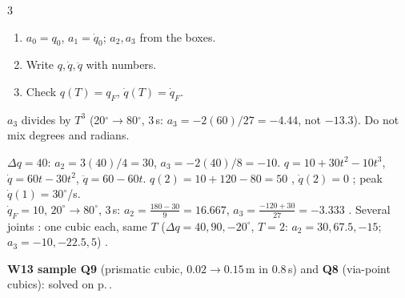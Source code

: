 \begin{multicols}{3}
\begin{recipe}
\begin{enumerate}
\item $a_0=q_0$, $a_1=\dot q_0$; $a_2,a_3$ from the boxes.
\item Write $q,\dot q,\ddot q$ with numbers.
\item Check $q(T)=q_F$, $\dot q(T)=\dot q_F$.
\end{enumerate}
\end{recipe}
\begin{trap}
$a_3$ divides by $T^3$ (20$^\circ\to$80$^\circ$, 3\,s: $a_3=-2(60)/27=-4.44$, not $-13.3$). Do not mix degrees and radians.
\end{trap}
\begin{worked}
$\Delta q=40$: $a_2=3(40)/4=30$, $a_3=-2(40)/8=-10$.
$q=10+30t^2-10t^3$, $\dot q=60t-30t^2$, $\ddot q=60-60t$. $q(2)=10+120-80=50$ \checkmark, $\dot q(2)=0$ \checkmark; peak $\dot q(1)=30^\circ$/s. \chk\\
$\dot q_F=10$, $20^\circ\to80^\circ$, 3\,s: $a_2=\frac{180-30}{9}=16.667$, $a_3=\frac{-120+30}{27}=-3.333$ \chk. Several joints : one cubic each, same $T$ ($\Delta q=40,90,-20^\circ$, $T=2$: $a_2=30,67.5,-15$; $a_3=-10,-22.5,5$) \chk.
\end{worked}
\textbf{W13 sample Q9} (prismatic cubic, $0.02\to0.15$\,m in 0.8\,s) and \textbf{Q8} (via-point cubics): solved on p.\,\pageref{p:SAMPLE}.


\end{multicols}
